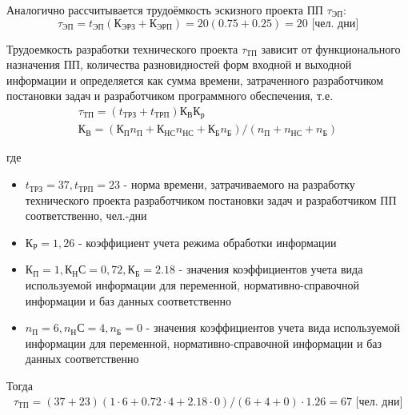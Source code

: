 Аналогично рассчитывается трудоёмкость эскизного проекта ПП $\tau_{ЭП}$:
\begin{equation}
	\tau_{ЭП} = t_{ЭП} (К_{ЭРЗ} + К_{ЭРП}) = 20 (0.75 + 0.25) = 20 \text{ [чел. дни]}
\end{equation}

Трудоемкость разработки технического проекта $\tau_{ТП}$ зависит от функционального назначения ПП, количества разновидностей форм входной и выходной информации и определяется как сумма времени, затраченного разработчиком постановки задач и разработчиком программного обеспечения, т.е.
\begin{gather*}
	\tau_{ТП} = (t_{ТРЗ} + t_{ТРП}) К_В К_р \\
	К_В = (К_П n_П + К_{НС} n_{НС} + К_Б n_Б) / (n_П + n_{НС} + n_Б)
\end{gather*}

где 
\begin{itemize}
  \item $t_{ТРЗ} = 37, t_{ТРП} = 23$ - норма времени, затрачиваемого на разработку технического проекта разработчиком постановки задач и разработчиком ПП соответственно, чел.-дни
  \item $К_Р = 1,26$ - коэффициент учета режима обработки информации
  \item $К_П = 1, К_НС = 0,72, К_Б = 2.18$ - значения коэффициентов учета вида используемой информации для переменной, нормативно-справочной информации и баз данных соответственно
  \item $n_П = 6, n_НС = 4, n_Б = 0$ - значения коэффициентов учета вида используемой информации для переменной, нормативно-справочной информации и баз данных соответственно
\end{itemize}
Тогда 
\begin{gather*}
	\tau_{ТП} = (37 + 23) (1 \cdot 6 + 0.72 \cdot 4 + 2.18 \cdot 0) / (6 + 4 + 0) \cdot 1.26 = 67 \text{ [чел. дни]}
\end{gather*}

